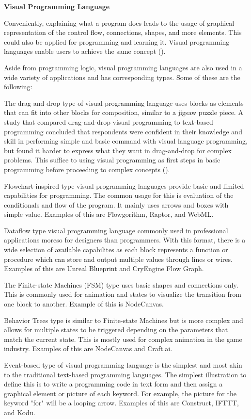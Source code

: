 \flushleft
\textbf{Visual Programming Language}\\
\justifying

\parx
Conveniently, explaining what a program does leads to the usage of graphical
representation of the control flow, connections, shapes, and more elements. This could
also be applied for programming and learning it. Visual programming languages enable
users to achieve the same concept (\cite{remi_2015}).

\parx
Aside from programming logic, visual programming languages are also used in a wide
variety of applications and has corresponding types. Some of these are the following:

\parx
The drag-and-drop type of visual programming language uses blocks as elements that can
fit into other blocks for composition, similar to a jigsaw puzzle piece. A study that
compared drag-and-drop visual programming to text-based programming concluded that
respondents were confident in their knowledge and skill in performing simple and basic
command with visual language programming, but found it harder to express what they want
in drag-and-drop for complex problems. This suffice to using visual programming as first
steps in basic programming before proceeding to complex concepts (\cite{disalvo_2014}).

\parx
Flowchart-inspired type visual programming languages provide basic and limited
capabilities for programming. The common usage for this is evaluation of the
conditionals and flow of the program.  It mainly uses arrows and boxes with simple
value.  Examples of this are Flowgorithm, Raptor, and WebML.

\parx
Dataflow type visual programming language commonly used in professional applications
moreso for designers than programmers. With this format, there is a wide selection
of available capabilites as each block represents a function or procedure which can
store and output multiple values through lines or wires. Examples of this are Unreal
Blueprint and CryEngine Flow Graph.

\parx
The Finite-state Machines (FSM) type uses basic shapes and connections only. This is
commonly used for animation and states to visualize the transition from one block to
another. Example of this is NodeCanvas.

\parx
Behavior Trees type is similar to Finite-state Machines but is more complex and allows
for multiple states to be triggered depending on the parameters that match the current
state. This is mostly used for complex animation in the game industry. Examples of
this are NodeCanvas and Craft.ai.

\parx
Event-based type of visual programming language is the simplest and most akin to
the traditional text-based programming languages. The simplest illustration to define
this is to write a programming code in text form and then assign a graphical element
or picture of each keyword. For example, the picture for the keyword "for" will be a
looping arrow. Examples of this are Construct, IFTTT, and Kodu.
